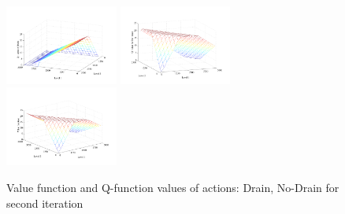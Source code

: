 \begin{figure}[t]
\centering
\includegraphics[width=0.33\textwidth]{Figures1/reservoir/Q2-Drain.pdf}
\includegraphics[width=0.33\textwidth]{Figures1/reservoir/Q2-noDrain.pdf}
\includegraphics[width=0.33\textwidth]{Figures1/reservoir/v2plot.pdf}
\caption{%
Value function and Q-function values of actions: Drain, No-Drain for second iteration
}
\label{fig:v2plots}
\end{figure}
